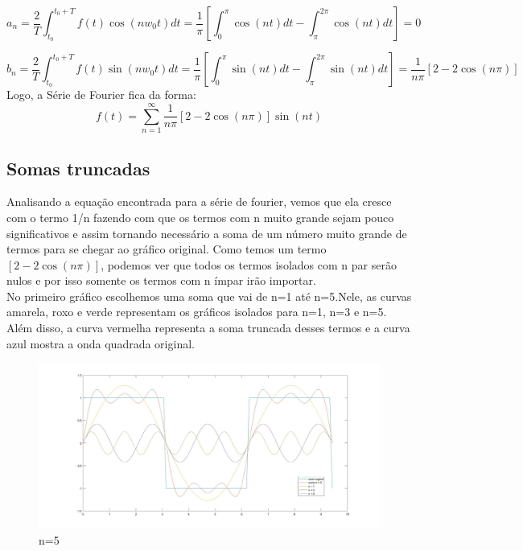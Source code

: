 \documentclass[a4paper,12pt,twoside]{article}
\begin{document}
\begin{equation}
a_{n} = \frac{2}{T}\int_{t_{0}}^{t_{0} +T} f(t)\cos (nw_{0}t)dt = \frac{1}{\pi}[\int_{0}^{\pi}\cos (nt)dt -\int_{\pi}^{2\pi}\cos (nt)dt] = 0
\end{equation}

\begin{equation}
b_{n} = \frac{2}{T}\int_{t_{0}}^{t_{0} +T} f(t)\sin (nw_{0}t)dt = \frac{1}{\pi}[\int_{0}^{\pi}\sin  (nt)dt -\int_{\pi}^{2\pi}\sin (nt)dt] = \frac{1}{n\pi}[2-2\cos (n\pi)]
\end{equation}
Logo, a Série de Fourier fica da forma:
\begin{equation}
    f(t) =\sum_{n=1}^{\infty} \frac{1}{n\pi}[2-2\cos(n\pi)]\sin(nt)
\end{equation}
\subsection{Somas truncadas}
Analisando a equação encontrada para a série de fourier, vemos que ela cresce com o termo 1/n fazendo com que os termos com n muito grande sejam pouco significativos e assim tornando necessário a soma de um número muito grande de termos para se chegar ao gráfico original. Como temos um termo $[2-2\cos(n\pi)]$, podemos ver que todos os termos isolados com n par serão nulos e por isso somente os termos com n ímpar irão importar.\\
\indent No primeiro gráfico escolhemos uma soma que vai de n=1 até n=5.Nele, as curvas amarela, roxo e verde representam os gráficos isolados para n=1, n=3 e n=5. Além disso, a curva vermelha representa a soma truncada desses termos e a curva azul mostra a onda quadrada original.
\begin{figure}[H]
\centering
\includegraphics[scale=0.25]{n=5.jpg}
\caption{n=5}
\label{fig:n=5}
\end{figure}
\end{document}
